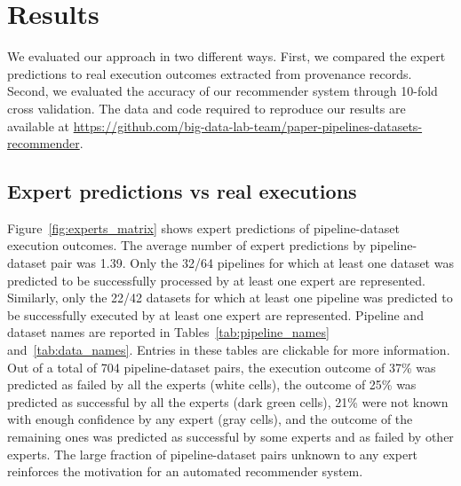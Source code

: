 
\section{Results}

We evaluated our approach in two different ways. First, 
we compared the expert predictions to 
real execution outcomes extracted from provenance records.
Second, we evaluated 
the accuracy of our recommender system through 10-fold cross validation. The data and code required to reproduce our results are available at  \url{https://github.com/big-data-lab-team/paper-pipelines-datasets-recommender}. 

\subsection{Expert predictions vs real executions}


Figure~\ref{fig:experts_matrix} shows expert predictions of
pipeline-dataset execution outcomes. The average number of expert predictions by pipeline-dataset pair was 1.39. Only the 32/64 pipelines for which at
least one dataset was predicted to be successfully processed by at least
one expert are represented.  Similarly, only the 22/42 datasets for which
at least one pipeline was predicted to be successfully executed by at least
one expert are represented. Pipeline and dataset names are reported in Tables~\ref{tab:pipeline_names} and~\ref{tab:data_names}. Entries in these tables are clickable for more information. Out of a total of 704 pipeline-dataset pairs,
the execution outcome of 37\% was predicted as failed by all the experts
(white cells), the outcome of 25\% was predicted as successful by all the
experts (dark green cells), 21\% were not known with enough confidence by
any expert (gray cells), and the outcome of the remaining ones was
predicted as successful by some experts and as failed by other experts. The
large fraction of pipeline-dataset pairs unknown to any expert reinforces
the motivation for an automated recommender system.

